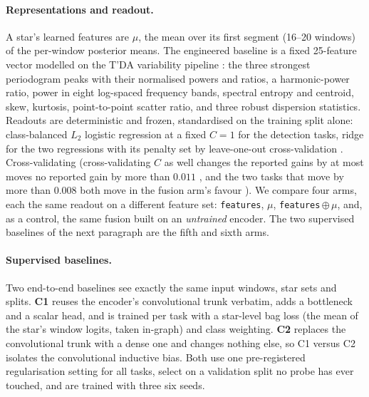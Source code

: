 \documentclass{article}
\providecommand{\DIFaddtex}[1]{{\protect\color{blue} \sf #1}} %
\providecommand{\DIFdeltex}[1]{{\protect\color{red} \scriptsize #1}} %
\providecommand{\DIFaddbegin}{} %
\providecommand{\DIFaddend}{} %
\providecommand{\DIFdelbegin}{} %
\providecommand{\DIFdelend}{} %
\providecommand{\DIFadd}[1]{\texorpdfstring{\DIFaddtex{#1}}{#1}} %
\providecommand{\DIFdel}[1]{\texorpdfstring{\DIFdeltex{#1}}{}} %
\providecommand{\DIFscaledelfig}{0.5}
\newlength{\DIFdelgraphicswidth} %
\newlength{\DIFdelgraphicsheight} %
\providecommand{\DIFaddincludegraphics}[2][]{{\color{blue}\fbox{\DIFOincludegraphics[#1]{#2}}}} %
\providecommand{\DIFdelincludegraphics}[2][]{%
\sbox{\DIFdelgraphicsbox}{\DIFOincludegraphics[#1]{#2}}%
\settoboxwidth{\DIFdelgraphicswidth}{\DIFdelgraphicsbox} %
\settoboxtotalheight{\DIFdelgraphicsheight}{\DIFdelgraphicsbox} %
\scalebox{\DIFscaledelfig}{%
\parbox[b]{\DIFdelgraphicswidth}{\usebox{\DIFdelgraphicsbox}\\[-\baselineskip] \rule{\DIFdelgraphicswidth}{0em}}\llap{\resizebox{\DIFdelgraphicswidth}{\DIFdelgraphicsheight}{%
\setlength{\unitlength}{\DIFdelgraphicswidth}%
\begin{picture}(1,1)%
\thicklines\linethickness{2pt} %
{\color[rgb]{1,0,0}\put(0,0){\framebox(1,1){}}}%
{\color[rgb]{1,0,0}\put(0,0){\line( 1,1){1}}}%
{\color[rgb]{1,0,0}\put(0,1){\line(1,-1){1}}}%
\end{picture}%
}\hspace*{3pt}}} %
} %
\DeclareRobustCommand{\DIFaddbegin}{\DIFOaddbegin \let\includegraphics\DIFaddincludegraphics} %
\DeclareRobustCommand{\DIFaddend}{\DIFOaddend \let\includegraphics\DIFOincludegraphics} %
\DeclareRobustCommand{\DIFdelbegin}{\DIFOdelbegin \let\includegraphics\DIFdelincludegraphics} %
\DeclareRobustCommand{\DIFdelend}{\DIFOaddend \let\includegraphics\DIFOincludegraphics} %
\begin{document}
\paragraph{Representations and readout.} A star's learned features are $\mu$, the mean over its first
segment (16--20 windows) of the per-window posterior means. The engineered baseline is a fixed
25-feature vector modelled on the T'DA variability pipeline \citep{audenaert2021}: the three
strongest periodogram peaks with their normalised powers and ratios, a harmonic-power ratio, power in
eight log-spaced frequency bands, spectral entropy and centroid, skew, kurtosis, point-to-point
scatter ratio, and three robust dispersion statistics. Readouts are deterministic and frozen,
standardised on the training split alone: class-balanced $L_{2}$ logistic regression at a fixed
$C = 1$ for the detection tasks, ridge for the two regressions with its penalty set by leave-one-out
cross-validation \DIFdelbegin \DIFdel{. Cross-validating }\DIFdelend \DIFaddbegin \DIFadd{(cross-validating }\DIFaddend $C$ as well \DIFdelbegin \DIFdel{changes the reported gains by at most }\DIFdelend \DIFaddbegin \DIFadd{moves no reported gain by more than }\DIFaddend $0.011$\DIFdelbegin \DIFdel{, and the
two tasks that move by more than $0.008$ both move in the fusion arm's favour}\DIFdelend \DIFaddbegin \DIFadd{)}\DIFaddend . We compare four
arms, each the same readout on a different feature set: \texttt{features}, $\mu$,
\texttt{features}\,$\oplus\,\mu$, and, as a control, the same fusion built on an \emph{untrained}
encoder. The two supervised baselines of the next paragraph are the fifth and sixth arms.

\paragraph{Supervised baselines.} Two end-to-end baselines see exactly the same input windows, star
sets and splits. \textbf{C1} reuses the encoder's convolutional trunk verbatim, adds a bottleneck and
a scalar head, and is trained per task with a star-level bag loss (the mean of the star's window
logits, taken in-graph) and class weighting. \textbf{C2} replaces the convolutional trunk with a
dense one and changes nothing else, so C1 versus C2 isolates the convolutional inductive bias. Both
use one pre-registered regularisation setting for all tasks, select on a validation split no probe
has ever touched, and are trained with \DIFdelbegin \DIFdel{three }\DIFdelend \DIFaddbegin \DIFadd{six }\DIFaddend seeds.
\end{document}
